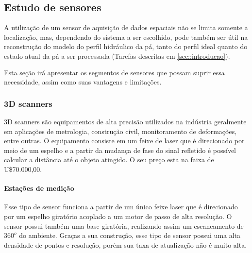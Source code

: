 \subsection{Estudo de sensores}

A utilização de um sensor de aquisição de dados espaciais não se limita somente
a localização, mas, dependendo do sistema a ser escolhido, pode também ser útil
na reconstrução do modelo do perfil hidráulico da pá, tanto do perfil ideal
quanto do estado atual da pá a ser processada (Tarefas descritas em
\ref{sec::introducao}).

Esta seção irá apresentar os segmentos de sensores que possam suprir essa
necessidade, assim como suas vantagens e limitações. 


\subsubsection{3D scanners}

3D scanners são equipamentos de alta precisão utilizados na indústria
geralmente em aplicações de metrologia, construção civil, monitoramento de
deformações, entre outras. O equipamento consiste em um feixe de laser que é
direcionado por meio de um espelho e a partir da mudança de fase do sinal
refletido é possível calcular a distância até o objeto atingido. O seu preço
esta na faixa de U\$70.000,00.

\paragraph{Estações de medição}

Esse tipo de sensor funciona a partir de um único feixe laser que é direcionado
por um espelho giratório acoplado a um motor de passo de alta resolução. O
sensor possui também uma base giratória, realizando assim um escaneamento de
$360^o$ do ambiente. Graças a sua construção, esse tipo de sensor possui uma
alta densidade de pontos e resolução, porém sua taxa de atualização não é muito
alta.

